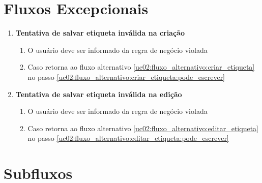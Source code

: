 \documentclass[
	12pt,				%
	oneside,			%
	a4paper,			%
	english,			%
	brazil,				%
	]{abntex2}
\begin{document}
\section{Fluxos Excepcionais}
\begin{enumerate}[label=\textbf{UC02-FE{\arabic*}},font=\normalsize]
    \item \textbf{\normalsize Tentativa de salvar etiqueta inválida na criação} \label{uc02:fluxo_excepcional:criacao_invalida}
    \begin{enumerate}[label={\arabic*}.]
       \item O usuário deve ser informado da regra de negócio violada
       \item Caso retorna ao fluxo alternativo \ref{uc02:fluxo_alternativo:criar_etiqueta} no passo \ref{uc02:fluxo_alternativo:criar_etiqueta:pode_escrever}
    \end{enumerate}

     \item \textbf{\normalsize Tentativa de salvar etiqueta inválida na edição} \label{uc02:fluxo_excepcional:edicao_invalida}
    \begin{enumerate}[label={\arabic*}.]
       \item O usuário deve ser informado da regra de negócio violada
        \item Caso retorna ao fluxo alternativo \ref{uc02:fluxo_alternativo:editar_etiqueta} no passo \ref{uc02:fluxo_alternativo:editar_etiqueta:pode_escrever}
    \end{enumerate}
\end{enumerate}

\section{Subfluxos}
\end{document}
